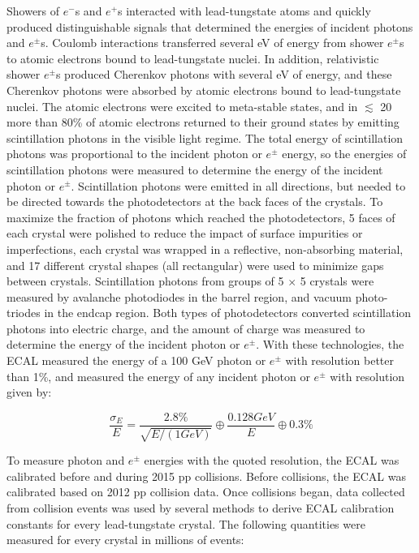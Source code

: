 Showers of $e^{-}$s and $e^{+}$s interacted with lead-tungstate atoms and quickly produced distinguishable 
signals that determined the energies of incident photons and $e^{\pm}$s.  Coulomb interactions 
transferred several eV of energy from shower $e^{\pm}$s to atomic electrons bound to lead-tungstate nuclei.  
In addition, relativistic shower $e^{\pm}$s produced Cherenkov photons with several eV of energy, and 
these Cherenkov photons were absorbed by atomic electrons bound to lead-tungstate nuclei.  The atomic 
electrons were excited to meta-stable states, and in $\lesssim$ 20 \ns more than 80\% of atomic electrons 
returned to their ground states by emitting scintillation photons in the visible light regime.  The total energy of 
scintillation photons was proportional to the incident photon or $e^{\pm}$ energy, so the energies 
of scintillation photons were measured to determine the energy of the incident photon or $e^{\pm}$.  Scintillation  
photons were emitted in all directions, but needed to be directed towards the photodetectors at the back faces of the crystals.  To 
maximize the fraction of photons which reached the photodetectors, 5 faces of each crystal were polished 
to reduce the impact of surface impurities or imperfections, each crystal was wrapped in a reflective, 
non-absorbing material, and 17 different crystal shapes (all rectangular) were used to minimize gaps 
between crystals.  Scintillation photons from groups of 5 $\times$ 5 crystals were measured by avalanche 
photodiodes in the barrel region, and vacuum photo-triodes in the endcap region.  Both types of 
photodetectors converted scintillation photons into electric charge, and the amount of charge was measured 
to determine the energy of the incident photon or $e^{\pm}$.  With these technologies, the ECAL measured 
the energy of a 100 GeV photon or $e^{\pm}$ with resolution better than 1\%, and measured the energy of any 
incident photon or $e^{\pm}$ with resolution given by:

\begin{equation}
	\frac{\sigma_{E}}{E} = \frac{2.8\%}{\sqrt{E/(1 GeV)}} \oplus \frac{0.128 GeV}{E} \oplus 0.3\%
\end{equation}

To measure photon and $e^{\pm}$ energies with the quoted resolution, the ECAL was calibrated before 
and during 2015 pp collisions.  Before collisions, the ECAL was calibrated based on 2012 pp collision 
data.  Once collisions began, data collected from collision events was used by several methods 
to derive ECAL calibration constants for every lead-tungstate crystal.  The following quantities 
were measured for every crystal in millions of events:


